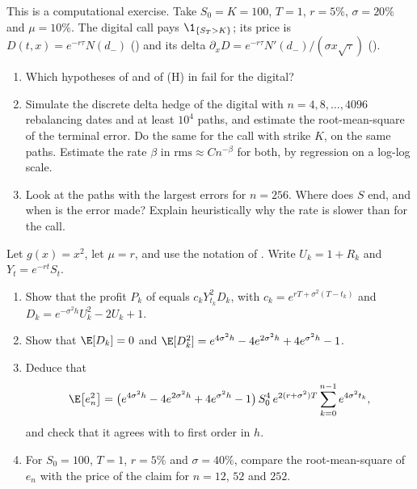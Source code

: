 \begin{exercise}\label{ex:dh-digital}
\medium This is a computational exercise. Take $S_0=K=100$, $T=1$, $r=5\%$, $\sigma=20\%$ and
$\mu=10\%$. The digital call pays $\1_{\{S_T>K\}}$; its price is $D(t,x)=e^{-r\tau}N(d_-)$
() and its delta $\partial_xD=e^{-r\tau}N'(d_-)/(\sigma x\sqrt\tau)$
().
\begin{enumerate}[label=(\alph*)]
  \item Which hypotheses of  and of (H) in
     fail for the digital?
  \item Simulate the discrete delta hedge of the digital with $n=4,8,\dots,4096$ rebalancing
    dates and at least $10^4$ paths, and estimate the root-mean-square of the terminal error.
    Do the same for the call with strike $K$, on the same paths. Estimate the rate $\beta$ in
    $\text{rms}\approx Cn^{-\beta}$ for both, by regression on a log-log scale.
  \item Look at the paths with the largest errors for $n=256$. Where does $S$ end, and when is
    the error made? Explain heuristically why the rate is slower than for the call.
\end{enumerate}
\end{exercise}

\begin{exercise}\label{ex:dh-squared}
\medium Let $g(x)=x^2$, let $\mu=r$, and use the notation of . Write
$U_k=1+R_k$ and $Y_t=e^{-rt}S_t$.
\begin{enumerate}[label=(\alph*)]
  \item Show that the profit $P_k$ of  equals
    $c_kY_{t_k}^2D_k$, with $c_k=e^{rT+\sigma^2(T-t_k)}$ and $D_k=e^{-\sigma^2h}U_k^2-2U_k+1$.
  \item Show that $\E[D_k]=0$ and $\E[D_k^2]=e^{4\sigma^2h}-4e^{2\sigma^2h}+4e^{\sigma^2h}-1$.
  \item Deduce that
    \[
      \E\big[e_n^2\big]=\big(e^{4\sigma^2h}-4e^{2\sigma^2h}+4e^{\sigma^2h}-1\big)\,S_0^4\,e^{2(r+\sigma^2)T}\sum_{k=0}^{n-1}e^{4\sigma^2t_k},
    \]
    and check that it agrees with  to first order in $h$.
  \item For $S_0=100$, $T=1$, $r=5\%$ and $\sigma=40\%$, compare the root-mean-square of $e_n$ with
    the price of the claim for $n=12$, $52$ and $252$.
\end{enumerate}
\end{exercise}

